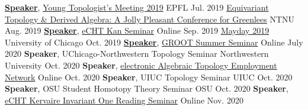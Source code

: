 \begin{conferences}
    {}
    {\textbf{\href{https://web.ma.utexas.edu/users/richard.wong/slides/YTM_Picard_Group_Talk.pdf}{Speaker}}, \href{https://ytm2019.epfl.ch/}{Young Topologist's Meeting 2019}}
    {EPFL}
    {Jul. 2019}
  \conference
    {}
    {\href{https://sites.google.com/view/etda2019/}{Equivariant Topology \& Derived Algebra: A Jolly Pleasant Conference for Greenlees}}
    {NTNU}
    {Aug. 2019}
  \conference
    {}
    {\textbf{\href{https://web.ma.utexas.edu/users/richard.wong/slides/NishidaNilpotenceTalk.pdf}{Speaker}}, \href{https://s.wayne.edu/isaksen/echt/kan-seminar/}{eCHT Kan Seminar}}
    {Online}
    {Sep. 2019}
  \conference
    {}
    {\href{https://nilesjohnson.net/mayday2019/}{Mayday 2019}}
    {University of Chicago}
    {Oct. 2019}
  \conference
    {}
    {\textbf{\href{https://web.ma.utexas.edu/users/richard.wong/slides/Picard_Groups_of_Stable_Module_Categories.pdf}{Speaker}}, \href{https://sites.google.com/view/sarahpetersen/groot-summer-seminar}{GROOT Summer Seminar}}
    {Online}
    {July 2020}
 \conference
    {}
    {\textbf{Speaker}, UChicago-Northwestern Topology Seminar}
    {Northwestern University}
    {Oct. 2020}
 \conference
    {}
    {\textbf{Speaker}, \href{https://s.wayne.edu/echt/electronic-algebraic-topology-employment-network/}{electronic Algebraic Topology Employment Network}}
    {Online}
    {Oct. 2020}
 \conference
    {}
    {\textbf{Speaker}, UIUC Topology Seminar}
    {UIUC}
    {Oct. 2020}
 \conference
    {}
    {\textbf{Speaker}, OSU Student Homotopy Theory Seminar}
    {OSU}
    {Oct. 2020}
  \conference
    {}
    {\textbf{Speaker}, \href{https://s.wayne.edu/echt/echt-reading-seminars/echt-kervaire-invariant-one-reading-seminar/}{eCHT Kervaire Invariant One Reading Seminar}}
    {Online}
    {Nov. 2020}
\end{conferences}
